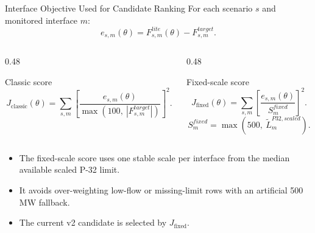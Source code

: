 \documentclass[aspectratio=169,10pt]{beamer}
\begin{document}
\begin{frame}{Interface Objective Used for Candidate Ranking}
\small
For each scenario $s$ and monitored interface $m$:
\[
e_{s,m}(\theta)
=
F_{s,m}^{lite}(\theta)-F_{s,m}^{target}.
\]

\vspace{-0.2em}
\begin{columns}[T,onlytextwidth]
\begin{column}{0.48\linewidth}
\begin{block}{Classic score}
\scriptsize
\[
J_{\mathrm{classic}}(\theta)
=
\sum_{s,m}
\left[
\frac{e_{s,m}(\theta)}
{\max(100,\ |F_{s,m}^{target}|)}
\right]^2.
\]
\end{block}
\end{column}
\begin{column}{0.48\linewidth}
\begin{block}{Fixed-scale score}
\scriptsize
\[
J_{\mathrm{fixed}}(\theta)
=
\sum_{s,m}
\left[
\frac{e_{s,m}(\theta)}
{S_m^{fixed}}
\right]^2.
\]
\[
S_m^{fixed}=\max(500,\ \widetilde{L}_m^{P32,scaled}).
\]
\end{block}
\end{column}
\end{columns}

\vspace{0.4em}
\begin{itemize}
  \item The fixed-scale score uses one stable scale per interface from the median available scaled P-32 limit.
  \item It avoids over-weighting low-flow or missing-limit rows with an artificial 500 MW fallback.
  \item The current v2 candidate is selected by $J_{\mathrm{fixed}}$.
\end{itemize}
\end{frame}
\end{document}
